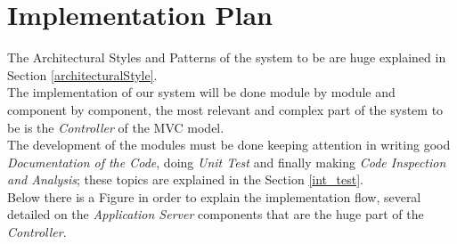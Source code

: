 \section{Implementation Plan}
The Architectural Styles and Patterns of the system to be are huge explained in Section \ref{architecturalStyle}.\\
The implementation of our system will be done module by module and component by component, the most relevant and complex part of the system to be is the \textit{Controller} of the MVC model.\\
The development of the modules must be done keeping attention in writing good \textit{Documentation of the Code}, doing \textit{Unit Test} and
finally making \textit{Code Inspection and Analysis}; these topics are explained in the Section \ref{int_test}.\\
Below there is a Figure in order to explain the implementation flow, several detailed on the \textit{Application Server} components that are the huge part of the \textit{Controller}.

